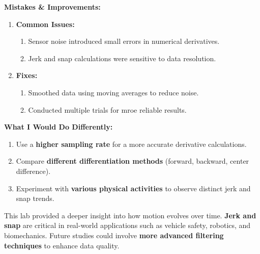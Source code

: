 \documentclass[idxtotoc,hyperref,openany]{labbook} %
\begin{document}

\textbf{Mistakes \& Improvements:}
\begin{enumerate}[$\bullet$]
    \item \textbf{Common Issues:}
    \begin{enumerate}[$\bullet$]
        \item Sensor noise introduced small errors in numerical derivatives.
        \item Jerk and snap calculations were sensitive to data resolution.
    \end{enumerate}
    \item \textbf{Fixes:}
    \begin{enumerate}[$\bullet$]
        \item Smoothed data using moving averages to reduce noise.
        \item Conducted multiple trials for mroe reliable results.
    \end{enumerate}
\end{enumerate}
\textbf{What I Would Do Differently:}
\begin{enumerate}[$\bullet$]
    \item Use a \textbf{higher sampling rate} for a more accurate derivative calculations.
    \item Compare \textbf{different differentiation methods} (forward, backward, center difference).
    \item Experiment with \textbf{various physical activities} to observe distinct jerk and snap trends.
\end{enumerate}


This lab provided a deeper insight into how motion evolves over time. \textbf{Jerk and snap} are critical in real-world applications such as vehicle safety, robotics, and biomechanics. Future studies could involve \textbf{more advanced filtering techniques} to enhance data quality.

\end{document}
